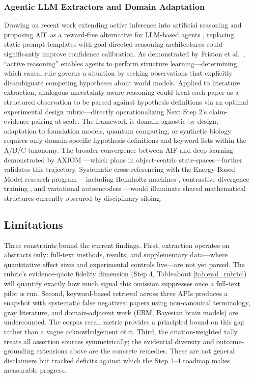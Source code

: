 \documentclass[
  english,
]{article}
\begin{document}
{{{{{{{{{{{{{{{{\subsubsection{Agentic LLM Extractors and Domain
Adaptation}\label{agentic-llm-extractors-and-domain-adaptation}

Drawing on recent work extending active inference into artificial
reasoning \citep{friston2025active} and proposing AIF as a reward-free
alternative for LLM-based agents \citep{wen2025missing}, replacing
static prompt templates with goal-directed reasoning architectures could
significantly improve confidence calibration. As demonstrated by Friston
et al.~\citep{friston2025active}, ``active reasoning'' enables agents to
perform structure learning---determining which causal rule governs a
situation by seeking observations that explicitly disambiguate competing
hypotheses about world models. Applied to literature extraction,
analogous uncertainty-aware reasoning could treat each paper as a
structured observation to be parsed against hypothesis definitions via
an optimal experimental design rubric---directly operationalizing Next
Step 2's claim-evidence pairing at scale. The framework is
domain-agnostic by design; adaptation to foundation models, quantum
computing, or synthetic biology requires only domain-specific hypothesis
definitions and keyword lists within the A/B/C taxonomy. The broader
convergence between AIF and deep learning demonstrated by AXIOM
\citep{heins2025axiom}---which plans in object-centric
state-spaces---further validates this trajectory. Systematic
cross-referencing with the Energy-Based Model research program
\citep{lecun2006tutorial}---including Helmholtz machines
\citep{dayan1995helmholtz}, contrastive divergence training
\citep{hinton2002training}, and variational autoencoders
\citep{kingma2014auto}---would illuminate shared mathematical structures
currently obscured by disciplinary siloing.

\subsection{Limitations}\label{limitations}

Three constraints bound the current findings. First, extraction operates
on abstracts only: full-text methods, results, and supplementary
data---where quantitative effect sizes and experimental controls
live---are not yet parsed. The rubric's evidence-quote fidelity
dimension (Step 4, Tableabout \ref{tab:eval_rubric}) will
quantify exactly how much signal this omission suppresses once a
full-text pilot is run. Second, keyword-based retrieval across three
APIs produces a snapshot with systematic false negatives: papers using
non-canonical terminology, gray literature, and domain-adjacent work
(EBM, Bayesian brain models) are undercounted. The corpus recall metric
provides a principled bound on this gap rather than a vague
acknowledgement of it. Third, the citation-weighted tally treats all
assertion sources symmetrically; the evidential diversity and
outcome-grounding extensions above are the concrete remedies. These are
not general disclaimers but tracked deficits against which the Step 1--4
roadmap makes measurable progress.

}}}}}}}}}}}}}}}}
\end{document}

